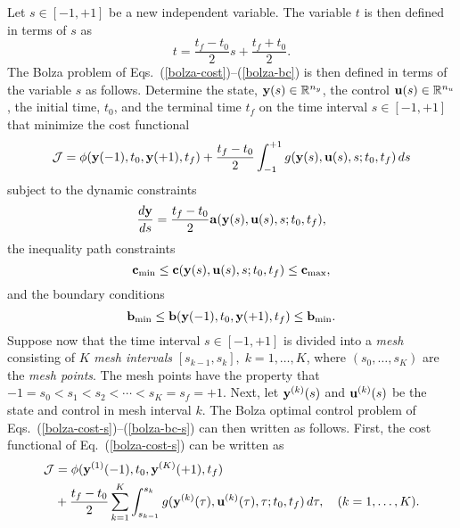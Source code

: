 \documentclass[prodmode,acmtecs]{acmsmall}
\begin{document}
Let $s\in[-1,+1]$ be a new independent variable.  The variable $t$ is
then defined in terms of $s$ as
\begin{equation}\label{stot}
  t = \frac{t_f-t_0}{2} s + \frac{t_f+t_0}{2}.  
\end{equation}
The Bolza problem of Eqs.~(\ref{bolza-cost})--(\ref{bolza-bc}) is then
defined in terms of the variable $s$ as follows.  Determine the state,
$\mathbf{y}(s)\in\mathbb{R}^{n_y}$, the control $\mathbf{u}(s)\in\mathbb{R}^{n_u}$, the initial
time, $t_0$, and the terminal time $t_f$ on the time interval
$s\in[-1,+1]$ that minimize the cost functional
\begin{equation}\label{bolza-cost-s}
  \mathcal{J} = \phi(\bfy(-1),t_0,\bfy(+1),t_f)+\frac{t_f-t_0}{2}\int_{-1}^{+1} g(\bfy(s),\bfu(s),s;t_0,t_f)\, ds
\end{equation} 
subject to the dynamic constraints
\begin{equation}\label{bolza-dyn-s}
  \frac{d\bfy}{ds} = \frac{t_f-t_0}{2}\bfa(\bfy(s),\bfu(s),s;t_0,t_f), 
\end{equation} 
the inequality path constraints
\begin{equation}\label{bolza-path-s}
\bfc_{\min} \leq \bfc(\bfy(s),\bfu(s),s;t_0,t_f)\leq \bfc_{\max},
\end{equation}
and the boundary conditions
\begin{equation}\label{bolza-bc-s}
  \bfb_{\min} \leq \bfb(\bfy(-1),t_0,\bfy(+1),t_f) \leq \bfb_{\min}. 
\end{equation}  
Suppose now that the time interval $s\in[-1,+1]$ is divided into a 
{\em mesh} consisting of $K$ {\em mesh intervals} 
$[s_{k-1},s_k],\; k=1,\ldots,K$, where  $(s_0,\ldots,s_K)$ are the
{\em mesh points}.  The mesh points have the property that
$-1=s_0<s_1<s_2<\cdots<s_K=s_f=+1$.  Next, let $\mathbf{y}^{(k)}(s)$ and
$\mathbf{u}^{(k)}(s)$ be the state and control in mesh interval $k$. The
Bolza optimal control problem of
Eqs.~(\ref{bolza-cost-s})--(\ref{bolza-bc-s}) can then written as
follows.  First, the cost functional of Eq.~(\ref{bolza-cost-s}) can
be written as 
\begin{equation}\label{bolza-cost-segmented}
  \begin{split}
 \mathcal{J} & = \phi(\bfy^{(1)}(-1),t_0,\bfy^{(K)}(+1),t_f) \\
                   &+ \frac{t_f-t_0}{2}\sum_{k=1}^K \int_{s_{k-1}}^{s_k} g(\bfy^{(k)}(\tau),\bfu^{(k)}(\tau),\tau;t_0,t_f)\, d\tau, \quad  (k=1,\ldots,K). 
  \end{split}
\end{equation}
\end{document}

